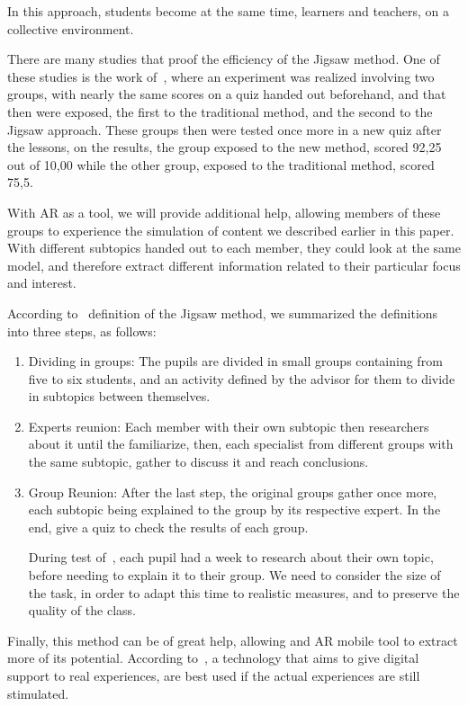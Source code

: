 \documentclass[a4paper,twoside]{article}
\begin{document}
In this approach, students become at the same time, learners and teachers, on a collective environment.

There are many studies that proof the efficiency of the Jigsaw method. One of these studies is the work of~\cite{kilic2008effects}, where an experiment was realized involving two groups, with nearly the same scores on a quiz handed out beforehand, and that then were exposed, the first to the traditional method, and the second to the Jigsaw approach. These groups then were tested once more in a new quiz after the lessons, on the results, the group exposed to the new method, scored 92,25 out of 10,00 while the other group, exposed to the traditional method, scored 75,5.

With AR as a tool, we will provide additional help, allowing members of these groups to experience the simulation of content we described earlier in this paper. With different subtopics handed out to each member, they could look at the same model, and therefore extract different information related to their particular focus and interest.

According to~\cite{TheJi25} definition of the Jigsaw method, we summarized the definitions into three steps, as follows:
\begin{enumerate}
\item Dividing in groups: The pupils are divided in small groups containing from five to six students, and an activity defined by the advisor for them to divide in subtopics between themselves.
\item Experts reunion: Each member with their own subtopic then researchers about it until the familiarize, then, each specialist from different groups with the same subtopic, gather to discuss it and reach conclusions.
\item Group Reunion: After the last step, the original groups gather once more, each subtopic being explained to the group by its respective expert. In the end, give a quiz to check the results of each group. 

During test of~\cite{kilic2008effects}, each pupil had a week to research about their own topic, before needing to explain it to their group. We need to consider the size of the task, in order to adapt this time to realistic measures, and to preserve the quality of the class.
\end{enumerate}
Finally, this method can be of great help, allowing and AR mobile tool to extract more of its potential. According to~\cite{milhomemabordagem}, a technology that aims to give digital support to real experiences, are best used if the actual experiences are still stimulated.
\end{document}
